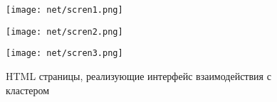 %
%
%
%
%
%
%

\begin{figure}
	\centering
	\begin{minipage}[h]{0.6\linewidth}
		\texttt{[image: net/scren1.png]}
	\end{minipage}
	\hfill
	\begin{minipage}[h]{0.6\linewidth}
		\texttt{[image: net/scren2.png]}
	\end{minipage}
	\hfill
	\begin{minipage}[h]{0.6\linewidth}
		\texttt{[image: net/scren3.png]}
	\end{minipage}
	\caption{HTML страницы, реализующие интерфейс взаимодействия с кластером}
	\label{fig:html}
\end{figure}

